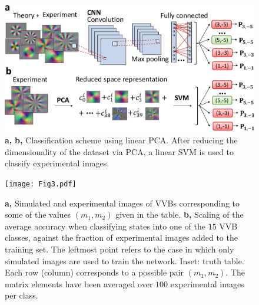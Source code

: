 \documentclass[
	aps, prl, superscriptaddress, twocolumn,
	10pt
	floatfix, 
    nofootinbib,
	tightenlines
]{revtex4-1}
\begin{document}
\begin{figure}[b]
    \centering
     \includegraphics[width=\columnwidth]{Fig2.pdf}
    \caption{
    {\bf a,} 
    {\bf b,} 
    Classification scheme using linear PCA.
    After reducing the dimensionality of the dataset via PCA, a linear SVM is used to classify experimental images. 
    }
    \label{fig:class_techniques}
\end{figure}

\begin{figure}
    \centering
    \texttt{[image: Fig3.pdf]}
    \caption{ 
    \textbf{a,} Simulated and experimental images of \acp{VVB} corresponding to some of the values $(m_1,m_2)$ given in the table.
    \textbf{b,} Scaling of the average accuracy  when classifying states into one of the $15$ VVB classes, against the fraction of experimental images added to the training set. The leftmost point refers to the case in which only simulated images are used to train the network.
    Inset: truth table.
    Each row (column) corresponds to a possible pair $(m_1,m_2)$.
    The matrix elements have been averaged over $100$ experimental images per class. 
    }%
    \label{fig:resultsCNN}
\end{figure}
\end{document}

